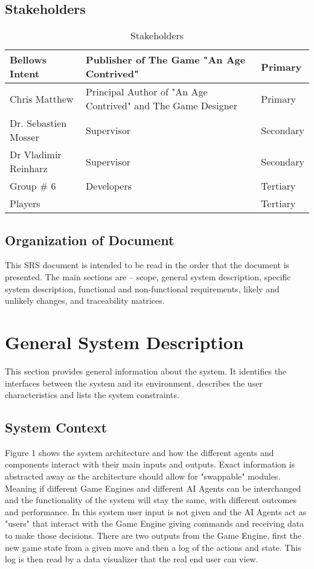 \documentclass[12pt]{article}
\begin{document}
\subsection{Stakeholders}
\begin{table}[h!]
\caption{Stakeholders} \label{Stakeholders}
\begin{tabularx}{\textwidth}{p{5cm}p{5cm}p{1.5cm}}
\toprule
Bellows Intent & Publisher of The Game "An Age Contrived" & Primary\\
\midrule
Chris Matthew & Principal Author of "An Age Contrived" and The Game Designer & Primary\\
\midrule
Dr. Sebastien Mosser & Supervisor & Secondary\\
\midrule
Dr Vladimir Reinharz & Supervisor & Secondary\\
\midrule
Group \# 6 & Developers & Tertiary\\
\midrule
Players & & Tertiary\\
\bottomrule
\end{tabularx}
\end{table}

\noindent 

\subsection{Organization of Document}

This SRS document is intended to be read in the order that the document is presented. The main sections are – scope, general system description, specific system description, functional and non-functional requirements, likely and unlikely changes, and traceability matrices.


\section{General System Description}

This section provides general information about the system.  It identifies the
interfaces between the system and its environment, describes the user
characteristics and lists the system constraints.

\subsection{System Context}

Figure 1 shows the system architecture and how the different agents and components interact with their main inputs and outputs. Exact information is abstracted away as the architecture should allow for "swappable" modules. Meaning if different Game Engines and different AI Agents can be interchanged and the functionality of the system will stay the same, with different outcomes and performance. In this system user input is not given and the AI Agents act as "users" that interact with the Game Engine giving commands and receiving data to make those decisions. There are two outputs from the Game Engine, first the new game state from a given move and then a log of the actions and state. This log is then read by a data visualizer that the real end user can view.
\end{document}
